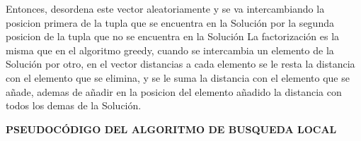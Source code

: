 \documentclass{article}
\begin{document}
\newline Entonces, desordena este vector aleatoriamente y se va intercambiando la posicion primera
de la tupla que se encuentra en la Solución por la segunda posicion de la tupla que no se encuentra en la Solución
\newline La factorización es la misma que en el algoritmo greedy, cuando se intercambia un elemento de la Solución
por otro, en el vector distancias a cada elemento se le resta la distancia con el elemento que se elimina,
y se le suma la distancia con el elemento que se añade, ademas de añadir en la posicion del elemento añadido
la distancia con todos los demas de la Solución.

\vspace{10mm}
\newpage
\maketitle \textbf{PSEUDOCÓDIGO DEL ALGORITMO DE BUSQUEDA LOCAL}
\end{document}
